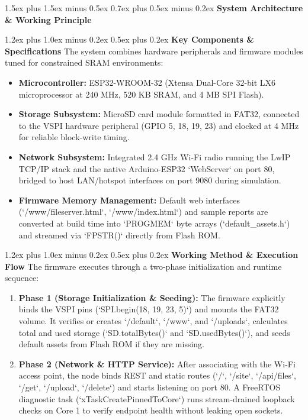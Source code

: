 \documentclass[conference]{IEEEtran}
\makeatletter
\renewcommand\section{\@startsection{section}{1}{\z@}%
  {1.5ex plus 1.5ex minus 0.5ex}%
  {0.7ex plus 0.5ex minus 0.2ex}%
  {\normalfont\normalsize\bfseries\centering}}
\renewcommand\subsection{\@startsection{subsection}{2}{\z@}%
  {1.2ex plus 1.0ex minus 0.2ex}%
  {0.5ex plus 0.2ex}%
  {\normalfont\normalsize\bfseries}}
\makeatother
\begin{document}
\section{\textbf{System Architecture \& Working Principle}}

\subsection{\textbf{Key Components \& Specifications}}
The system combines hardware peripherals and firmware modules tuned for constrained SRAM environments:
\begin{itemize}
    \item \textbf{Microcontroller:} ESP32-WROOM-32 (Xtensa Dual-Core 32-bit LX6 microprocessor at 240 MHz, 520 KB SRAM, and 4 MB SPI Flash).
    \item \textbf{Storage Subsystem:} MicroSD card module formatted in FAT32, connected to the VSPI hardware peripheral (GPIO 5, 18, 19, 23) and clocked at 4 MHz for reliable block-write timing.
    \item \textbf{Network Subsystem:} Integrated 2.4 GHz Wi-Fi radio running the LwIP TCP/IP stack and the native Arduino-ESP32 `WebServer` on port 80, bridged to host LAN/hotspot interfaces on port 9080 during simulation.
    \item \textbf{Firmware Memory Management:} Default web interfaces (`/www/fileserver.html`, `/www/index.html`) and sample reports are converted at build time into `PROGMEM` byte arrays (`default_assets.h`) and streamed via `FPSTR()` directly from Flash ROM.
\end{itemize}

\subsection{\textbf{Working Method \& Execution Flow}}
The firmware executes through a two-phase initialization and runtime sequence:
\begin{enumerate}
    \item \textbf{Phase 1 (Storage Initialization \& Seeding):} The firmware explicitly binds the VSPI pins (`SPI.begin(18, 19, 23, 5)`) and mounts the FAT32 volume. It verifies or creates `/default`, `/www`, and `/uploads`, calculates total and used storage (`SD.totalBytes()` and `SD.usedBytes()`), and seeds default assets from Flash ROM if they are missing.
    \item \textbf{Phase 2 (Network \& HTTP Service):} After associating with the Wi-Fi access point, the node binds REST and static routes (`/`, `/site`, `/api/files`, `/get`, `/upload`, `/delete`) and starts listening on port 80. A FreeRTOS diagnostic task (`xTaskCreatePinnedToCore`) runs stream-drained loopback checks on Core 1 to verify endpoint health without leaking open sockets.
\end{enumerate}
\end{document}
